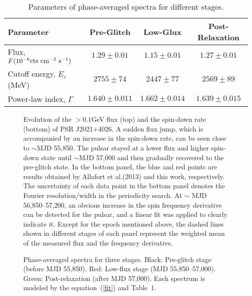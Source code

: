 \documentclass[12pt,preprint]{aastex}
\begin{document}
  \begin{table*}
    \centering
    \label{tabel1}
    \begin{tabular}{lccc}
      \hline\hline
     Parameter  &  Pre-Glitch & Low-Glux & Post-Relaxation \\\hline
     Flux, $F (10^{-6}{\rm cts~cm^{-2}~s^{-1}})$ \dotfill  & $1.29\pm 0.01$  & $1.15\pm 0.01$      & $1.27\pm 0.01$ \\ 
     Cutoff energy, $E_c$ (MeV)\dotfill & $2755\pm 74$   &  $2447\pm 77$   & $2569\pm 89$       \\ 
     Power-law  index, $\Gamma$ \dotfill& $1.640\pm 0.011$   &  $1.662\pm 0.014$       & $1.639\pm0.015$    \\ \hline
    \end{tabular}
    \caption{Parameters of phase-averaged spectra for different stages.}
  \end{table*}  
  
 \begin{figure}
   \centering
   \caption{Evolution of the $>0.1$GeV flux (top) and the spin-down rate (bottom) of PSR J2021+4026. 
A sudden flux jump, which is accompanied by an increase in the spin-down rate, can be seen close to $\sim$MJD 55,850. 
The pulsar stayed at a lower flux and higher spin-down state until $\sim$MJD 57,000 and then gradually recovered to the pre-glitch state. 
In the bottom panel, the blue and red points are results obtained by Allafort et al.(2013)  and this work, respectively.    The uncertainty of each data point in the bottom panel denotes  the Fourier resolution/width in the
  periodicity search.   At $\sim$ MJD 56,850--57,200, an obvious increase in the spin frequency derivative can be detected for the pulsar, and a linear fit was applied to clearly indicate it. 
     Except for the epoch mentioned above, the dashed lines shown in different stages of each panel represent the weighted mean of the measured flux and the frequency derivative.}
   \label{evolution}
 \end{figure}
 
 \begin{figure}
   \centering
   \caption{Phase-averaged spectra for three stages. 
   Black: Pre-glitch stage (before MJD 55,850). 
   Red: Low-flux stage (MJD 55,850--57,000). 
   Green: Post-relaxation (after MJD 57,000).
   Each spectrum is modeled by the equation~(\ref{fit}) and Table~1.}
     \label{spectrum}
 \end{figure}
 
\end{document}
